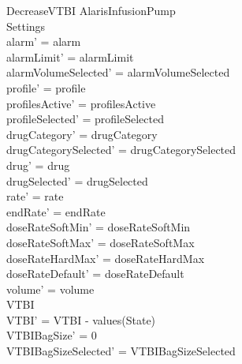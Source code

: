 \begin{schema}{DecreaseVTBI}
	\Delta AlarisInfusionPump\\
	Settings\\
	\where
	alarm' = alarm\\
	alarmLimit' = alarmLimit\\
	alarmVolumeSelected' = alarmVolumeSelected\\
	profile' = profile\\
	profilesActive' = profilesActive\\  
	  profileSelected' = profileSelected\\
	drugCategory' = drugCategory\\ drugCategorySelected' = drugCategorySelected\\
	drug' = drug\\ drugSelected' = drugSelected\\
	rate' = rate\\
	endRate' = endRate\\
	doseRateSoftMin' = doseRateSoftMin\\
	doseRateSoftMax' = doseRateSoftMax\\
	doseRateHardMax' = doseRateHardMax\\
	doseRateDefault' = doseRateDefault\\
	\pagebreak
	volume' = volume\\
	VTBI \\
	VTBI' = VTBI - values(State)\\
	VTBIBagSize' = 0\\ VTBIBagSizeSelected' = VTBIBagSizeSelected\\

\end{schema}
